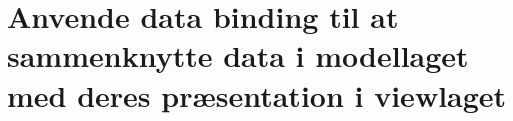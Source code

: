 \section{Anvende data binding til at sammenknytte data i modellaget med deres præsentation i viewlaget}\label{sec:spm7}